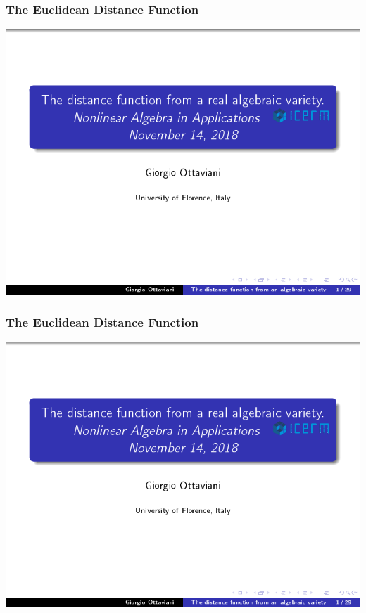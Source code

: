 \documentclass{beamer}
\begin{document}
\begin{frame}
\frametitle{The Euclidean Distance Function}
\includegraphics[page=7, clip, trim=0in 0in 0in 0in, width=\textwidth]{The_distance_function_from_a_real_algebraic_variety_]_Giorgio_Ottaviani,_University_of_Florence.pdf}
\end{frame}

\begin{frame}
\frametitle{The Euclidean Distance Function}
\includegraphics[page=15, clip, trim=0in 0in 0in 0in, width=\textwidth]{The_distance_function_from_a_real_algebraic_variety_]_Giorgio_Ottaviani,_University_of_Florence.pdf}
\end{frame}
\end{document}
